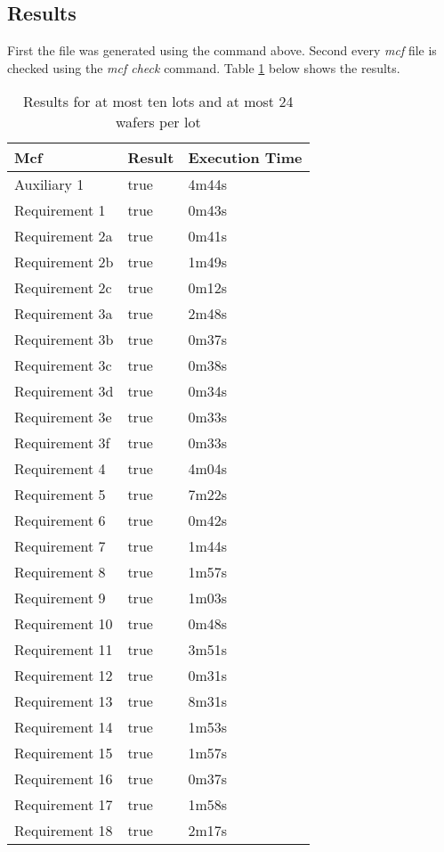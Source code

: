 \subsection{Results}
First the  file was generated using the  command above. Second every \textit{mcf} file is checked using the \textit{mcf check} command.
Table \ref{tab:results10-24} below shows the results.
\begin{table}[!hb]
    \centering
    \begin{tabular}{|l|l|l|}
        \hline
        \textbf{Mcf} & \textbf{Result} & \textbf{Execution Time} \\ \hline
        Auxiliary 1 & true & 4m44s \\ \hline
        Requirement 1 & true & 0m43s \\ \hline
        Requirement 2a & true & 0m41s \\ \hline
        Requirement 2b & true & 1m49s \\ \hline
        Requirement 2c & true & 0m12s \\ \hline
        Requirement 3a & true & 2m48s \\ \hline
        Requirement 3b & true & 0m37s \\ \hline
        Requirement 3c & true & 0m38s \\ \hline
        Requirement 3d & true & 0m34s \\ \hline
        Requirement 3e & true & 0m33s \\ \hline
        Requirement 3f & true & 0m33s \\ \hline
        Requirement 4 & true & 4m04s \\ \hline
        Requirement 5 & true & 7m22s \\ \hline
        Requirement 6 & true & 0m42s \\ \hline
        Requirement 7 & true & 1m44s \\ \hline
        Requirement 8 & true & 1m57s \\ \hline
        Requirement 9 & true & 1m03s \\ \hline
        Requirement 10 & true & 0m48s \\ \hline
        Requirement 11 & true & 3m51s \\ \hline
        Requirement 12 & true & 0m31s \\ \hline
        Requirement 13 & true & 8m31s \\ \hline
        Requirement 14 & true & 1m53s \\ \hline
        Requirement 15 & true & 1m57s \\ \hline
        Requirement 16 & true & 0m37s \\ \hline
        Requirement 17 & true & 1m58s \\ \hline
        Requirement 18 & true & 2m17s \\ \hline
    \end{tabular}
    \caption{Results for at most ten lots and at most 24 wafers per lot}
    \label{tab:results10-24}
\end{table}